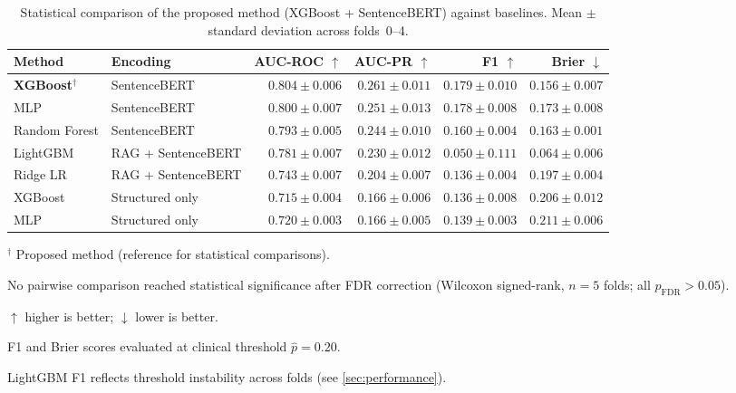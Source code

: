 \begin{table}[ht]
\centering
\begin{threeparttable}
\caption{Statistical comparison of the proposed method (XGBoost + SentenceBERT)
         against baselines. Mean $\pm$ standard deviation across folds~0--4.
         \label{tab:comparison}}
\begin{tabular}{llrrrr}
\toprule
Method & Encoding &
  AUC-ROC $\uparrow$ &
  AUC-PR $\uparrow$ &
  F1 $\uparrow$ &
  Brier $\downarrow$ \\
\midrule
\textbf{XGBoost}$^{\dagger}$ & SentenceBERT
  & $\mathbf{0.804 \pm 0.006}$
  & $\mathbf{0.261 \pm 0.011}$
  & $0.179 \pm 0.010$
  & $0.156 \pm 0.007$ \\
MLP & SentenceBERT
  & $0.800 \pm 0.007$
  & $0.251 \pm 0.013$
  & $0.178 \pm 0.008$
  & $0.173 \pm 0.008$ \\
Random Forest & SentenceBERT
  & $0.793 \pm 0.005$
  & $0.244 \pm 0.010$
  & $0.160 \pm 0.004$
  & $0.163 \pm 0.001$ \\
LightGBM & RAG + SentenceBERT
  & $0.781 \pm 0.007$
  & $0.230 \pm 0.012$
  & $0.050 \pm 0.111$
  & $0.064 \pm 0.006$ \\
Ridge LR & RAG + SentenceBERT
  & $0.743 \pm 0.007$
  & $0.204 \pm 0.007$
  & $0.136 \pm 0.004$
  & $0.197 \pm 0.004$ \\
\midrule
XGBoost & Structured only
  & $0.715 \pm 0.004$
  & $0.166 \pm 0.006$
  & $0.136 \pm 0.008$
  & $0.206 \pm 0.012$ \\
MLP & Structured only
  & $0.720 \pm 0.003$
  & $0.166 \pm 0.005$
  & $0.139 \pm 0.003$
  & $0.211 \pm 0.006$ \\
\bottomrule
\end{tabular}
\begin{tablenotes}
  \footnotesize
  \item $^{\dagger}$ Proposed method (reference for statistical comparisons).
  \item No pairwise comparison reached statistical significance after FDR
        correction (Wilcoxon signed-rank, $n=5$ folds; all $p_{\text{FDR}} >
        0.05$).
  \item $\uparrow$ higher is better; $\downarrow$ lower is better.
  \item F1 and Brier scores evaluated at clinical threshold $\hat{p} = 0.20$.
  \item LightGBM F1 reflects threshold instability across folds (see
        \cref{sec:performance}).
\end{tablenotes}
\end{threeparttable}
\end{table}
